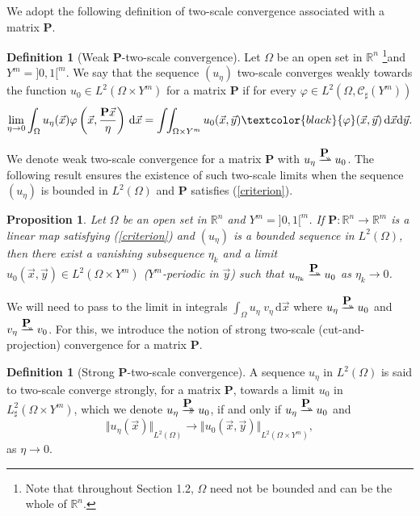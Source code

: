 \documentclass[a4paper,reqno]{amsart}
\numberwithin{equation}{section}
\numberwithin{equation}{section}		%
\numberwithin{figure}{section}			%
\numberwithin{table}{section}				%
\newcommand{\R}{\mathbb{R}}
\newtheorem{proposition}[theorem]{Proposition}
\theoremstyle{definition}
\newtheorem{definition}[theorem]{Definition}
\newcommand{\<}{\ensuremath \leq}
\renewcommand{\>}{\ensuremath \geq}
\def\e{\eta}
\def\ue{u_\e}
\def\uek{u_{\e_k}}
\def\IOm{\int_{\Omega}}
\def\IOAY{\int\!\!\int_{\Omega\times Y^m}}
\def\wdto{\buildrel\hbox{$\textbf{P}$}\over
\rightharpoonup \!\!\!\!\! \rightharpoonup}
\def\dto{\buildrel\hbox{$\textbf{P}$}\over
\to \!\!\!\!\! \to}
\def\uo{u_0(\vec{x},\vec{y})}
\def\O{\Omega}
\begin{document}
We adopt the following definition of two-scale convergence
associated with a matrix $\textbf{P}$.
\begin{definition}[Weak \textbf{P}-two-scale convergence]
Let $\Omega$ be an open set in $\R^n$ \footnote{Note that throughout Section 1.2, $\Omega$ need not be bounded and can be the whole of $\R^n$.}and $Y^m={]0,1[}^m$.
We say that the sequence $(u_\e)$ two-scale converges weakly towards the function $u_0\in L^2(\O\times Y^m)$ for a matrix $\textbf{P}$  if for every $\varphi\in L^2(\O,\mathcal{C}_\sharp(Y^m))$
  \begin{equation}\label{eq:weak2scale}
\lim _{\e\to 0} \IOm\ue (\vec{x}) \varphi\left(\vec{x}, \frac{\textbf{P}\vec{x}}{\e}\right) \,\mathrm{d}\vec{x} = \IOAY \uo \textcolor{black}{\varphi}(\vec{x},\vec{y})\,\mathrm{d}\vec{x}\mathrm{d}\vec{y}.
  \end{equation}
\end{definition}
We denote weak two-scale convergence for a matrix $\textbf{P}$ with   $\ue \wdto u_0$. 
The following result \cite[Proposition~2.3]{Bouchitte+etal2010} ensures the existence of such two-scale limits when
the sequence $(u_\e)$ is bounded in $L^2(\O)$ and $\textbf{P}$
satisfies (\ref{criterion}).

\begin{proposition}\label{prop:weaktwoscaleprop}
Let $\O$ be an open set in $\R^n$ and $Y^m={]0,1[}^m$. If
$\textbf{P}: \R^n \to \R^m$ is a linear map   satisfying (\ref{criterion}) and $(\ue)$ is a
bounded sequence in $L^2(\O)$, then there exist a vanishing
subsequence $\e_k$ and a limit $\uo \in L^2(\O\times Y^m)$
($Y^m$-periodic in $\vec{y}$) such that $\uek \wdto u_0$ as $\e_k \to 0$.
\end{proposition}
\noindent
We will need to pass to the limit in integrals
$\displaystyle{\int_{\Omega} u_\e \; v_\e \, \mathrm{d}\vec{x}}$ where
$u_\e\wdto u_0$ and $v_\e\wdto v_0$. For this, we introduce 
the notion of strong two-scale
(cut-and-projection) convergence for a matrix $\textbf{P}$.
\begin{definition}[Strong \textbf{P}-two-scale convergence]
A sequence $u_\e$ in $L^2(\O)$ is said to two-scale converge strongly, for a matrix $\textbf{P}$, towards a limit $u_0$ in
$L^2_\sharp (\O\times Y^m)$, which we denote $u_\e\dto u_0$, if and
only if $\ue \wdto u_0$   and
\begin{equation}
\displaystyle{ {\Vert u_\e(\vec{x})\Vert}_{L^2(\O)} \to{\Vert u_0
(\vec{x},\vec{y}) \Vert}_{L^2(\O\times Y^m)}},
\end{equation}
as $\e \to 0$.   
\end{definition}
\end{document}

